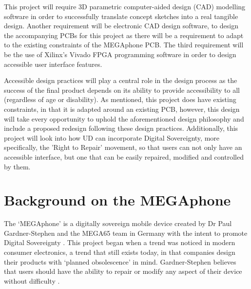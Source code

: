 This project will require 3D parametric computer-aided design (CAD) modelling software in order to successfully translate concept sketches into a real tangible design.
Another requirement will be electronic CAD design software, to design the accompanying PCBs for this project as there will be a requirement to adapt to the existing constraints of the MEGAphone PCB.
The third requirement will be the use of Xilinx's Vivado FPGA programming software in order to design accessible user interface features.

Accessible design practices will play a central role in the design process as the success of the final product depends on its ability to provide accessibility to all (regardless of age or disability). 
As mentioned, this project does have existing constraints, in that it is adapted around an existing PCB, however, this design will take every opportunity to uphold the aforementioned design philosophy and include a proposed redesign following these design practices.
Additionally, this project will look into how UD can incorporate Digital Sovereignty, more specifically, the 'Right to Repair' movement, so that users can not only have an accessible interface, but one that can be easily repaired, modified and controlled by them.

\section{Background on the MEGAphone}

The ‘MEGAphone’ is a digitally sovereign mobile device created by Dr Paul Gardner-Stephen and the MEGA65 team in Germany with the intent to promote Digital Sovereignty \cite{mega65}.
This project began when a trend was noticed in modern consumer electronics, a trend that still exists today, in that companies design their products with ‘planned obsolescence’ in mind. 
Gardner-Stephen believes that users should have the ability to repair or modify any aspect of their device without difficulty \cite{mobilehistory}.

